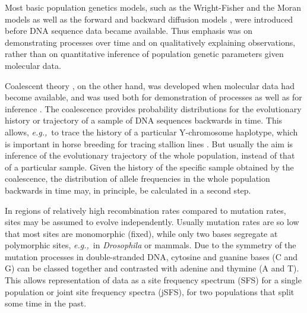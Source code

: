 \documentclass[preprint]{elsarticle}
\newcommand\eg{{\it e.g.,}}
\begin{document}
Most basic population genetics models, such as the Wright-Fisher and the Moran models as well as the forward and backward diffusion models \citep[reviewed in][]{Ewen04}, were introduced before DNA sequence data became available. Thus emphasis was on demonstrating processes over time and on qualitatively explaining observations, rather than on quantitative inference of population genetic parameters given molecular data.

Coalescent theory \citep{King82}, on the other hand, was developed when molecular data had become available, and was used both for demonstration of processes as well as for inference \citep{Hein05,Wake09}. The coalescence provides probability distributions for the evolutionary history or trajectory of a sample of DNA sequences backwards in time. This allows, \eg\ to trace the history of a particular Y-chromosome haplotype, which is important in horse breeding for tracing stallion lines \citep{Wall13}. But usually the aim is inference of the evolutionary trajectory of the whole population, instead of that of a particular sample. Given the history of the specific sample obtained by the coalescence, the distribution of allele frequencies in the whole population backwards in time may, in principle, be calculated in a second step. 

In regions of relatively high recombination rates compared to mutation rates, sites may be assumed to evolve independently. Usually mutation rates are so low that most sites are monomorphic (fixed), while only two bases segregate at polymorphic sites, \eg\ in \textit{Drosophila} or mammals. Due to the symmetry of the mutation processes in double-stranded DNA, cytosine and guanine bases (C and G) can be classed together and contrasted with adenine and thymine (A and T). This allows representation of data as a site frequency spectrum (SFS) for a single population or joint site frequency spectra (jSFS), for two populations that split some time in the past. 
\end{document}
